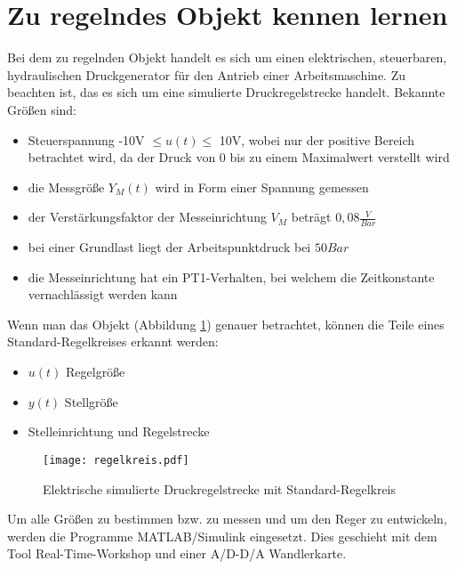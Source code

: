 
\newpage
[Hansert]
\section{Zu regelndes Objekt kennen lernen}
Bei dem zu regelnden Objekt handelt es sich um einen elektrischen, steuerbaren, hydraulischen Druckgenerator für den Antrieb einer Arbeitsmaschine. Zu beachten ist, das es sich um eine simulierte Druckregelstrecke handelt. Bekannte Größen sind:

\begin{itemize}
\item Steuerspannung -10V $\leq u(t) \leq$ 10V, wobei nur der positive Bereich betrachtet wird, da der Druck von 0 bis zu einem Maximalwert verstellt wird

\item die Messgröße $Y_{M}(t)$ wird in Form einer Spannung gemessen

\item der Verstärkungsfaktor der Messeinrichtung $V_{M}$ beträgt $0,08\frac{V}{Bar}$

\item bei einer Grundlast liegt der Arbeitspunktdruck bei $50Bar$

\item die Messeinrichtung hat ein PT1-Verhalten, bei welchem die Zeitkonstante vernachlässigt werden kann 
\end{itemize}


Wenn man das Objekt (Abbildung \ref{RegelKreis}) genauer betrachtet, können die Teile eines Standard-Regelkreises erkannt werden:
\begin{itemize}
\item $u(t)$ Regelgröße
\item $y(t)$ Stellgröße
\item Stelleinrichtung und Regelstrecke
\end{itemize}

\begin{figure}[htbp]
	\begin{center}
		\texttt{[image: regelkreis.pdf]}
		\caption{Elektrische simulierte Druckregelstrecke mit Standard-Regelkreis}
       \label{RegelKreis}
	\end{center} 
\end{figure}

\newpage

Um alle Größen zu bestimmen bzw. zu messen und um den Reger zu entwickeln, werden die Programme MATLAB/Simulink eingesetzt. Dies geschieht mit dem Tool Real-Time-Workshop und einer A/D-D/A Wandlerkarte.


